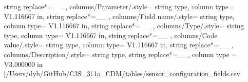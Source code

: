 \begin{landscape}
{            string replace*={_}{\_}
        },
    columns/Parameter/.style={
            string type, 
            column type= V{1.116667 in}, 
            string replace*={_}{\_}
        },
    columns/Field name/.style={
            string type, 
            column type= V{1.116667 in}, 
            string replace*={_}{\_}
        },
    columns/Type/.style={
            string type, 
            column type= V{1.116667 in}, 
            string replace*={_}{\_}
        },
    columns/Code value/.style={
            string type, 
            column type= V{1.116667 in}, 
            string replace*={_}{\_}
        },
    columns/Description/.style={
            string type, 
            string replace*={_}{\_},
            column type = V{3.000000 in}
        }
    ]{/Users/dyb/GitHub/C3S_311a_CDM/tables/sensor_configuration_fields.csv}
\end{landscape}
